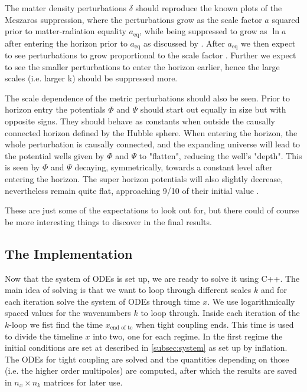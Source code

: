 \documentclass[twocolumn]{aastex62}
\begin{document}
The matter density perturbations $\delta$ should reproduce the known plots of the Meszaros suppression, where the perturbations grow as the scale factor $a$ squared prior to matter-radiation equality $a_\text{eq}$, while being suppressed to grow as $\ln a$ after entering the horizon prior to $a_\text{eq}$ as discussed by \cite{dodelson:2003}. After $a_\text{eq}$ we then expect to see perturbations to grow proportional to the scale factor \citep[]{dodelson:2003}. Further we expect to see the smaller perturbations to enter the horizon earlier, hence the large scales (i.e. larger k) should be suppressed more. 

The scale dependence of the metric perturbations should also be seen. Prior to horizon entry the potentials $\Phi$ and $\Psi$ should start out equally in size but with opposite signs. They should behave as constants when outside the causally connected horizon defined by the Hubble sphere. When entering the horizon, the whole perturbation is causally connected, and the expanding universe will lead to the potential wells given by $\Phi$ and $\Psi$ to "flatten", reducing the well's "depth". This is seen by $\Phi$ and $\Psi$ decaying, symmetrically, towards a constant level after entering the horizon. The super horizon potentials will also slightly decrease, nevertheless remain quite flat, approaching 9/10 of their initial value \citep[]{dodelson:2003}.  

These are just some of the expectations to look out for, but there could of course be more interesting things to discover in the final results.

\subsection{The Implementation} \label{subsec:implementation}
Now that the system of ODEs is set up, we are ready to solve it using C++. The main idea of solving is that we want to loop through different scales $k$ and for each iteration solve the system of ODEs through time $x$. We use logarithmically spaced values for the wavenumbers $k$ to loop through. Inside each iteration of the $k$-loop we fist find the time $x_\text{end of tc}$ when tight coupling ends. This time is used to divide the timeline $x$ into two, one for each regime. In the first regime the initial conditions are set at described in \ref{subsec:system} as set up by inflation. The ODEs for tight coupling are solved and the quantities depending on those (i.e. the higher order multipoles) are computed, after which the results are saved in $n_x\times n_k$ matrices for later use.
\end{document}
